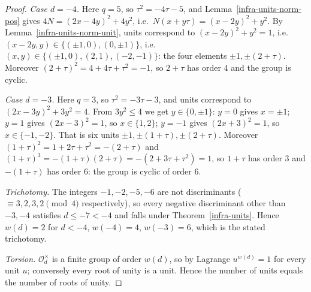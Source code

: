 \begin{proof}
  \emph{Case $d = -4$.} Here $q = 5$, so $\tau^2 = -4\tau - 5$, and
  Lemma~\ref{infra-units-norm-pos} gives
  $4N = (2x-4y)^2 + 4y^2$, i.e.\ $N(x+y\tau) = (x-2y)^2 + y^2$. By
  Lemma~\ref{infra-units-norm-unit}, units correspond to
  $(x-2y)^2 + y^2 = 1$, i.e.\ $(x-2y, y) \in \{(\pm 1, 0), (0, \pm 1)\}$, i.e.\
  $(x,y) \in \{(\pm 1, 0), (2, 1), (-2, -1)\}$: the four elements
  $\pm 1, \pm(2+\tau)$. Moreover
  $(2+\tau)^2 = 4 + 4\tau + \tau^2 = -1$, so $2+\tau$ has order $4$ and the
  group is cyclic.

  \emph{Case $d = -3$.} Here $q = 3$, so $\tau^2 = -3\tau - 3$, and units
  correspond to $(2x-3y)^2 + 3y^2 = 4$. From $3y^2 \le 4$ we get
  $y \in \{0, \pm 1\}$: $y = 0$ gives $x = \pm 1$; $y = 1$ gives
  $(2x-3)^2 = 1$, so $x \in \{1, 2\}$; $y = -1$ gives $(2x+3)^2 = 1$, so
  $x \in \{-1, -2\}$. That is six units
  $\pm 1, \pm(1+\tau), \pm(2+\tau)$. Moreover
  $(1+\tau)^2 = 1 + 2\tau + \tau^2 = -(2+\tau)$ and
  $(1+\tau)^3 = -(1+\tau)(2+\tau) = -(2 + 3\tau + \tau^2) = 1$, so $1+\tau$ has
  order $3$ and $-(1+\tau)$ has order $6$: the group is cyclic of order $6$.

  \emph{Trichotomy.} The integers $-1, -2, -5, -6$ are not discriminants
  ($\equiv 3, 2, 3, 2 \pmod 4$ respectively), so every negative discriminant
  other than $-3, -4$ satisfies $d \le -7 < -4$ and falls under
  Theorem~\ref{infra-units}. Hence $w(d) = 2$ for $d < -4$, $w(-4) = 4$,
  $w(-3) = 6$, which is the stated trichotomy.

  \emph{Torsion.} $\mathcal{O}_d^\times$ is a finite group of order $w(d)$, so by
  Lagrange $u^{w(d)} = 1$ for every unit $u$; conversely every root of unity is
  a unit. Hence the number of units equals the number of roots of unity.
\end{proof}
